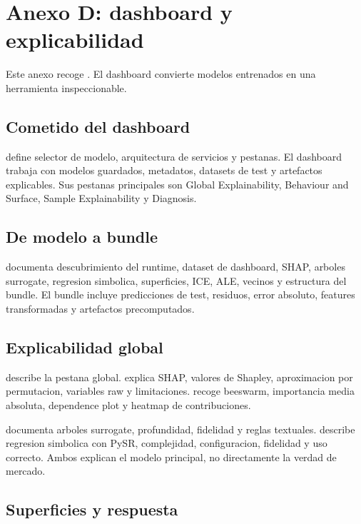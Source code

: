 \chapter{Anexo D: dashboard y explicabilidad}

Este anexo recoge . El dashboard convierte modelos entrenados en una herramienta inspeccionable.

\section{Cometido del dashboard}

 define selector de modelo, arquitectura de servicios y pestanas. El dashboard trabaja con modelos guardados, metadatos, datasets de test y artefactos explicables. Sus pestanas principales son Global Explainability, Behaviour and Surface, Sample Explainability y Diagnosis.

\section{De modelo a bundle}

 documenta descubrimiento del runtime, dataset de dashboard, SHAP, arboles surrogate, regresion simbolica, superficies, ICE, ALE, vecinos y estructura del bundle. El bundle incluye predicciones de test, residuos, error absoluto, features transformadas y artefactos precomputados.

\section{Explicabilidad global}

 describe la pestana global.  explica SHAP, valores de Shapley, aproximacion por permutacion, variables raw y limitaciones.  recoge beeswarm, importancia media absoluta, dependence plot y heatmap de contribuciones.

 documenta arboles surrogate, profundidad, fidelidad y reglas textuales.  describe regresion simbolica con PySR, complejidad, configuracion, fidelidad y uso correcto. Ambos explican el modelo principal, no directamente la verdad de mercado.

\section{Superficies y respuesta}

